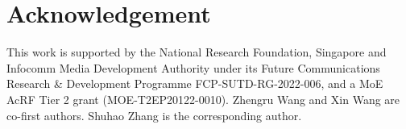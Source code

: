 \section*{Acknowledgement}
\label{sec:acknowledgement}
This work is supported by the National Research Foundation, Singapore and Infocomm Media Development Authority under its Future Communications Research \& Development Programme FCP-SUTD-RG-2022-006, and a MoE AcRF Tier 2 grant (MOE-T2EP20122-0010). Zhengru Wang and Xin Wang are co-first authors. Shuhao Zhang is the corresponding author.